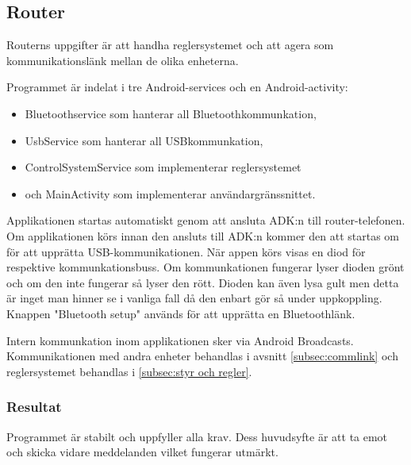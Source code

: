 \subsection{Router}
Routerns uppgifter är att handha reglersystemet och att agera som
kommunikationslänk mellan de olika enheterna.

Programmet är indelat i tre Android-services och en Android-activity:
\begin{itemize}
	\item Bluetoothservice som hanterar all Bluetoothkommunkation,
	\item UsbService som hanterar all USBkommunkation,
	\item ControlSystemService som implementerar reglersystemet
	\item och MainActivity som implementerar användargränssnittet.
\end{itemize}

Applikationen startas automatiskt genom att ansluta ADK:n till router-telefonen. 
Om applikationen körs innan den ansluts till ADK:n kommer den att startas om för
att upprätta USB-kommunikationen.
När appen körs visas en diod för respektive kommunkationsbuss. Om kommunkationen
fungerar lyser dioden grönt och om den inte fungerar så lyser den rött. Dioden
kan även lysa gult men detta är inget man hinner se i vanliga fall då den enbart
gör så under uppkoppling. Knappen "Bluetooth setup" används för att upprätta en
Bluetoothlänk.

Intern kommunkation inom applikationen sker via Android Broadcasts.
Kommunikationen med andra enheter behandlas i avsnitt \ref{subsec:commlink} och
reglersystemet behandlas i \ref{subsec:styr och regler}.

\subsubsection{Resultat}
Programmet är stabilt och uppfyller alla krav. Dess huvudsyfte är att ta emot
och skicka vidare meddelanden vilket fungerar utmärkt.